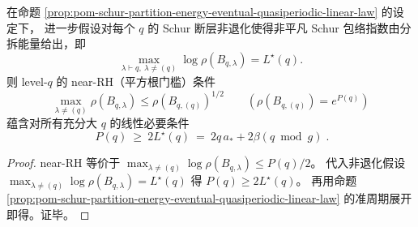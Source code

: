 \begin{corollary}\label{cor:pom-schur-near-rh-linear-necessary-quasiperiodic}
在命题 \ref{prop:pom-schur-partition-energy-eventual-quasiperiodic-linear-law} 的设定下，
进一步假设对每个 \(q\) 的 Schur 断层非退化使得非平凡 Schur 包络指数由分拆能量给出，即
\[
\max_{\lambda\vdash q,\ \lambda\neq(q)}\log\rho(B_{q,\lambda})=L^\star(q).
\]
则 level-\(q\) 的 near-RH（平方根门槛）条件
\[
\max_{\lambda\neq(q)}\rho(B_{q,\lambda})\le \rho(B_{q,(q)})^{1/2}
\qquad(\rho(B_{q,(q)})=e^{P(q)})
\]
蕴含对所有充分大 \(q\) 的线性必要条件
\[
\boxed{\;
P(q)\ \ge\ 2L^\star(q)\ =\ 2q\,a_*+2\beta(q\bmod g)\; }.
\]
\end{corollary}
\begin{proof}
near-RH 等价于
\(
\max_{\lambda\neq(q)}\log\rho(B_{q,\lambda})\le P(q)/2
\)。
代入非退化假设 \(\max_{\lambda\neq(q)}\log\rho(B_{q,\lambda})=L^\star(q)\) 得 \(P(q)\ge 2L^\star(q)\)。
再用命题 \ref{prop:pom-schur-partition-energy-eventual-quasiperiodic-linear-law} 的准周期展开即得。证毕。
\end{proof}

